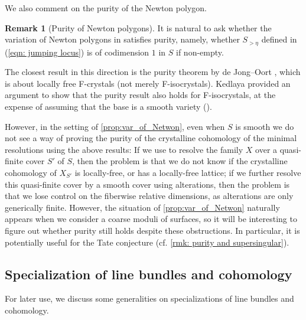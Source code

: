 \documentclass[11pt, letterpaper]{amsart}
\theoremstyle{plain}
\theoremstyle{definition}
\newtheorem{remark}[theorem]{Remark}
\newcommand{\<}{\langle}
\renewcommand{\>}{\rangle}
\begin{document}
We also comment on the purity of the Newton polygon.
\begin{remark}[Purity of Newton polygons]
\label{rmk: purity of Newton}
	It is natural to ask whether the variation of Newton polygons in  satisfies purity, namely, whether $S_{> \eta}$ defined in (\ref{eqn: jumping locus}) is of codimension $1$ in $S$ if non-empty. 

        The closest result in this direction is the purity theorem by de Jong--Oort \cite[Thm.\ 4.1]{dJO20}, which is about locally free F-crystals (not merely F-isocrystals). 
        Kedlaya provided an argument to show that the purity result also holds for F-isocrystals, at the expense of assuming that the base is a smooth variety (\cite[Thm.~3.12(b)]{Ked22}). 

        However, in the setting of \cref{prop:var_of_Netwon}, even when $S$ is smooth we do not see a way of proving the purity of the crystalline cohomology of the minimal resolutions using the above results: 
        If we use \cite{Artin-Res} to resolve the family $X$ over a quasi-finite cover $S'$ of $S$, then the problem is that we do not know if the crystalline cohomology of $X_{S'}$ is locally-free, or has a locally-free lattice; 
        if we further resolve this quasi-finite cover by a smooth cover using alterations, then the problem is that we lose control on the fiberwise relative dimensions, as alterations are only generically finite. 
        However, the situation of \cref{prop:var_of_Netwon} naturally appears when we consider a coarse moduli of surfaces, so it will be interesting to figure out whether purity still holds despite these obstructions. In particular, it is potentially useful for the Tate conjecture (cf. \cref{rmk: purity and supersingular}).  
\end{remark}



\subsection{Specialization of line bundles and cohomology}
\label{sub:specialization_of_lb}
For later use, we discuss some generalities on specializations of line bundles and cohomology. 
\end{document}

